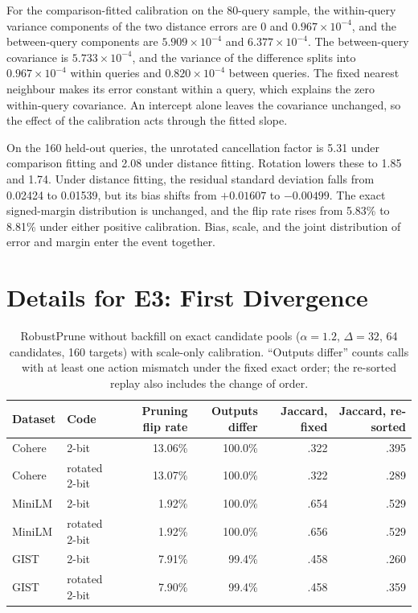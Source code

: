 For the comparison-fitted calibration on the 80-query sample, the within-query variance components of the two distance errors are $0$ and $0.967\times10^{-4}$, and the between-query components are $5.909\times10^{-4}$ and $6.377\times10^{-4}$. The between-query covariance is $5.733\times10^{-4}$, and the variance of the difference splits into $0.967\times10^{-4}$ within queries and $0.820\times10^{-4}$ between queries. The fixed nearest neighbour makes its error constant within a query, which explains the zero within-query covariance. An intercept alone leaves the covariance unchanged, so the effect of the calibration acts through the fitted slope.

On the 160 held-out queries, the unrotated cancellation factor is 5.31 under comparison fitting and 2.08 under distance fitting. Rotation lowers these to 1.85 and 1.74. Under distance fitting, the residual standard deviation falls from 0.02424 to 0.01539, but its bias shifts from $+0.01607$ to $-0.00499$. The exact signed-margin distribution is unchanged, and the flip rate rises from 5.83\% to 8.81\% under either positive calibration. Bias, scale, and the joint distribution of error and margin enter the event together.

\section{Details for E3: First Divergence}
\label{app:trace}

\begin{table}[tbp]
\centering


\small
\setlength{\tabcolsep}{5.5pt}
\begin{tabular}{llrrrr}
\toprule
Dataset & Code & Pruning flip rate & Outputs differ & Jaccard, fixed & Jaccard, re-sorted \\
\midrule
Cohere & 2-bit & 13.06\% & 100.0\% & .322 & .395 \\
Cohere & rotated 2-bit & 13.07\% & 100.0\% & .322 & .289 \\
MiniLM & 2-bit & 1.92\% & 100.0\% & .654 & .529 \\
MiniLM & rotated 2-bit & 1.92\% & 100.0\% & .656 & .529 \\
GIST & 2-bit & 7.91\% & 99.4\% & .458 & .260 \\
GIST & rotated 2-bit & 7.90\% & 99.4\% & .458 & .359 \\
\bottomrule
\end{tabular}

\small
\caption{RobustPrune without backfill on exact candidate pools ($\alpha=1.2$, $\Delta=32$, 64 candidates, 160 targets) with scale-only calibration. ``Outputs differ'' counts calls with at least one action mismatch under the fixed exact order; the re-sorted replay also includes the change of order.}
\label{tab:app-probe27}
\end{table}

